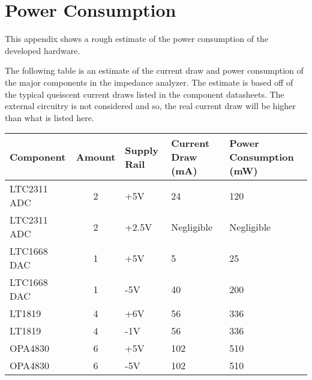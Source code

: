 \chapter{Power Consumption} \label{App:PowerConsumption}
This appendix shows a rough estimate of the power consumption of the developed hardware.

The following table  is an estimate of the current draw and power consumption of the major components in the impedance analyzer.
The estimate is based off of the typical queiscent current draws listed in the component datasheets. The external circuitry is not considered and so, the real current draw will be higher than what is listed here.

        \begin{table}[ht]
            \centering
            \begin{tabular}{@{}lcp{1.5cm}p{1.8cm}p{2cm}@{}}
            \toprule
            \textbf{Component}       & \textbf{Amount} & \textbf{Supply Rail} & \textbf{Current Draw (mA)} & \textbf{Power Consumption (mW)} \\ \midrule
            LTC2311 ADC              & 2               & +5V                  & 24                         & 120                              \\
            LTC2311 ADC              & 2               & +2.5V                & Negligible                 & Negligible                       \\
            LTC1668 DAC              & 1               & +5V                  & 5                          & 25                               \\
            LTC1668 DAC              & 1               & -5V                  & 40                        & 200                              \\
            LT1819                   & 4               & +6V                  & 56                         & 336                             \\
            LT1819                   & 4               & -1V                  & 56                         & 336                              \\
            OPA4830                  & 6               & +5V                  & 102                         & 510                             \\
            OPA4830                  & 6               & -5V                  & 102                         & 510                             \\

\end{tabular}
\end{table}
